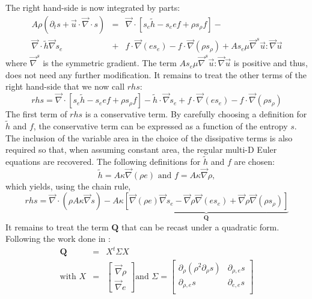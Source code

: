 \documentclass[preprint,10pt]{elsarticle}
\renewcommand{\div}{\vec{\nabla}\! \cdot \!}
\newcommand{\grad}{\vec{\nabla}}
\begin{document}
%
The right hand-side is now integrated by parts:
%
\begin{eqnarray}
\label{eq:ent_res_app3}
A \rho \left( \partial_t s + \vec{u} \cdot \div s \right) &=& \div \left[ s_e \tilde{h}-s_e e f  + \rho s_{\rho} f \right] -\nonumber \\
\div \tilde{h} \grad s_e  &+& f \cdot \grad (e s_e) -  f \cdot \grad ( \rho s_{\rho} ) + A s_e \mu \grad^s \vec{u} : \grad \vec{u} \nonumber
\end{eqnarray}
%
where $\grad^s$ is the symmetric gradient. The term $A s_e \mu \grad^s \vec{u} : \grad \vec{u}$ is positive and thus, does not need any further modification. It %
remains to treat the other terms of the right hand-side that we now call $rhs$:
%
\begin{equation}
rhs = \div \left[ s_e \tilde{h}-s_e e f  + \rho s_{\rho} f \right] - \tilde{h} \cdot \grad s_e  + f \cdot \grad (e s_e) - f \cdot \grad ( \rho s_{\rho} ) \nonumber
\end{equation}
%
The first term of $rhs$ is a conservative term. By carefully choosing a definition for $\tilde{h}$ and $f$, the conservative term can be expressed as a function of the entropy $s$. The inclusion of the variable area in the choice of the dissipative terms is also required so that, when assuming constant area, the regular multi-D Euler equations are recovered. The following definitions for $\tilde{h}$ and $f$ are chosen:
%
\begin{equation}
\tilde{h} = A \kappa \grad ( \rho e ) \text{ and } f = A \kappa \grad \rho, \nonumber 
\end{equation}
%
which yields, using the chain rule,
%
\begin{equation}
rhs = \div (\rho A \kappa \grad s ) - A \kappa \underbrace{\left[ \grad (\rho e) \grad s_e  - \grad \rho \grad (e s_e) +  \grad \rho \grad ( \rho s_{\rho} )  \right]}_{\mathbf{Q}} \nonumber
\end{equation}
%
It remains to treat the term $\mathbf{Q}$ that can be recast under a quadratic form. Following the work done in \cite{jlg}:
%
\begin{eqnarray}
\mathbf{Q} &=& X^t \Sigma X \nonumber \\
\text{with } X &=& \begin{bmatrix}
\grad \rho \\
\grad e 
\end{bmatrix}
\text{and } \Sigma = \begin{bmatrix}
       \partial_{\rho} (\rho^2 \partial_{\rho} s) & \partial_{\rho,e} s  \\[0.3em]
       \partial_{\rho,e} s & \partial_{e,e} s           \\[0.3em]
     \end{bmatrix} \nonumber 
\end{eqnarray}
\end{document}
